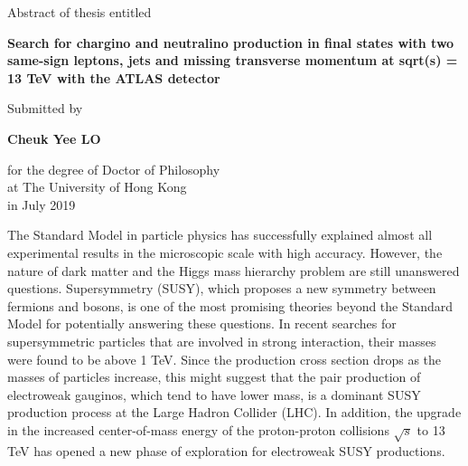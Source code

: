 {}

\begin{center}

Abstract of thesis entitled\\

\bigskip

    \huge\textbf{Search for chargino and neutralino production in final states with two same-sign leptons, jets and missing transverse momentum at sqrt(s) = 13 TeV with the ATLAS detector} \\

    \bigskip

    {\normalsize Submitted by}\\

\bigskip

    \Large{\textbf{Cheuk Yee LO}}\\

\bigskip

{\normalsize
for the degree of Doctor of Philosophy\\
at The University of Hong Kong\\
in July 2019\\}

\end{center}

\bigskip

The Standard Model in particle physics has successfully explained almost all experimental results in the microscopic scale with high accuracy.
However, the nature of dark matter and the Higgs mass hierarchy problem are still unanswered questions.
Supersymmetry (SUSY), which proposes a new symmetry between fermions and bosons, is one of the most promising theories beyond the Standard Model for potentially answering these questions.
In recent searches for supersymmetric particles that are involved in strong interaction, their masses were found to be above 1 TeV.
Since the production cross section drops as the masses of particles increase,
this might suggest that the pair production of electroweak gauginos, which tend to have lower mass, is a dominant SUSY production process at the Large Hadron Collider (LHC).
In addition, the upgrade in the increased center-of-mass energy of the proton-proton collisions $\sqrt{s}$ to 13 TeV has opened a new phase of exploration for electroweak SUSY productions.

